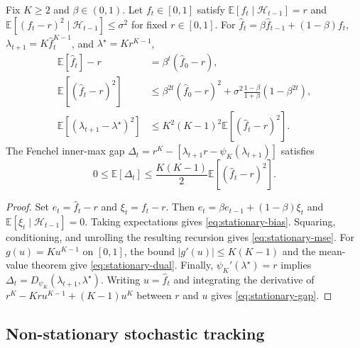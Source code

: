 \begin{proposition}
\label{prop:stationary-tracking}
Fix $K\geq2$ and $\beta\in(0,1)$.
Let $f_t\in[0,1]$ satisfy $\mathbb E[f_t\mid\mathcal H_{t-1}]=r$ and $\mathbb E[(f_t-r)^2\mid\mathcal H_{t-1}]\leq\sigma^2$ for fixed $r\in[0,1]$.
For $\widehat f_t=\beta\widehat f_{t-1}+(1-\beta)f_t$, $\lambda_{t+1}=K\widehat f_t^{K-1}$, and $\lambda^\star=Kr^{K-1}$,
\begin{align}
  \mathbb E[\widehat f_t]-r
  &=\beta^t(\widehat f_0-r),
  \label{eq:stationary-bias}\\
  \mathbb E[(\widehat f_t-r)^2]
  &\leq
  \beta^{2t}(\widehat f_0-r)^2
  +
  \sigma^2\frac{1-\beta}{1+\beta}(1-\beta^{2t}),
  \label{eq:stationary-mse}\\
  \mathbb E[(\lambda_{t+1}-\lambda^\star)^2]
  &\leq
  K^2(K-1)^2\mathbb E[(\widehat f_t-r)^2].
  \label{eq:stationary-dual}
\end{align}
The Fenchel inner-max gap $\Delta_t=r^K-[\lambda_{t+1}r-\psi_K(\lambda_{t+1})]$ satisfies
\begin{equation}
  0\leq\mathbb E[\Delta_t]
  \leq
  \frac{K(K-1)}{2}\mathbb E[(\widehat f_t-r)^2].
  \label{eq:stationary-gap}
\end{equation}
\end{proposition}

\begin{proof}
Set $e_t=\widehat f_t-r$ and $\xi_t=f_t-r$.
Then $e_t=\beta e_{t-1}+(1-\beta)\xi_t$ and $\mathbb E[\xi_t\mid\mathcal H_{t-1}]=0$.
Taking expectations gives \cref{eq:stationary-bias}.
Squaring, conditioning, and unrolling the resulting recursion gives \cref{eq:stationary-mse}.
For $g(u)=Ku^{K-1}$ on $[0,1]$, the bound $|g'(u)|\leq K(K-1)$ and the mean-value theorem give \cref{eq:stationary-dual}.
Finally, $\psi_K'(\lambda^\star)=r$ implies $\Delta_t=D_{\psi_K}(\lambda_{t+1},\lambda^\star)$.
Writing $u=\widehat f_t$ and integrating the derivative of $r^K-Kru^{K-1}+(K-1)u^K$ between $r$ and $u$ gives \cref{eq:stationary-gap}.
\end{proof}

\subsection{Non-stationary stochastic tracking}
\label{app:nonstationary-tracking}

